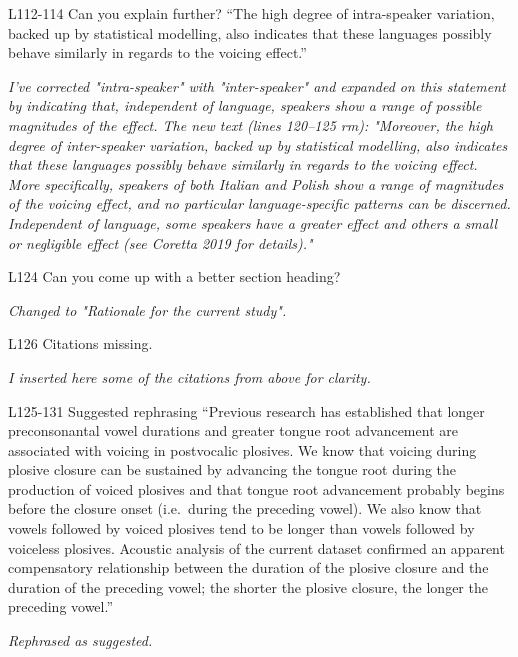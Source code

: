 \documentclass[]{article}
\begin{document}
L112-114 Can you explain further? ``The high degree of intra-speaker
variation, backed up by statistical modelling, also indicates that these
languages possibly behave similarly in regards to the voicing effect.''

\begin{adjustwidth}{1cm}{} \textit{
I've corrected "intra-speaker" with "inter-speaker" and expanded on this statement by indicating that, independent of language, speakers show a range of possible magnitudes of the effect. The new text (lines 120--125 rm): "Moreover, the high degree of inter-speaker variation, backed up by statistical modelling, also indicates that these languages possibly behave similarly in regards to the voicing effect. More specifically, speakers of both Italian and Polish show a range of magnitudes of the voicing effect, and no particular language-specific patterns can be discerned. Independent of language, some speakers have a greater effect and others a small or negligible effect (see Coretta 2019 for details)."
} \end{adjustwidth}

L124 Can you come up with a better section heading?

\begin{adjustwidth}{1cm}{} \textit{
Changed to "Rationale for the current study".
} \end{adjustwidth}

L126 Citations missing.

\begin{adjustwidth}{1cm}{} \textit{
I inserted here some of the citations from above for clarity.
} \end{adjustwidth}

L125-131 Suggested rephrasing ``Previous research has established that
longer preconsonantal vowel durations and greater tongue root
advancement are associated with voicing in postvocalic plosives. We know
that voicing during plosive closure can be sustained by advancing the
tongue root during the production of voiced plosives and that tongue
root advancement probably begins before the closure onset (i.e.~during
the preceding vowel). We also know that vowels followed by voiced
plosives tend to be longer than vowels followed by voiceless plosives.
Acoustic analysis of the current dataset confirmed an apparent
compensatory relationship between the duration of the plosive closure
and the duration of the preceding vowel; the shorter the plosive
closure, the longer the preceding vowel.''

\begin{adjustwidth}{1cm}{} \textit{
Rephrased as suggested.
} \end{adjustwidth}
\end{document}
